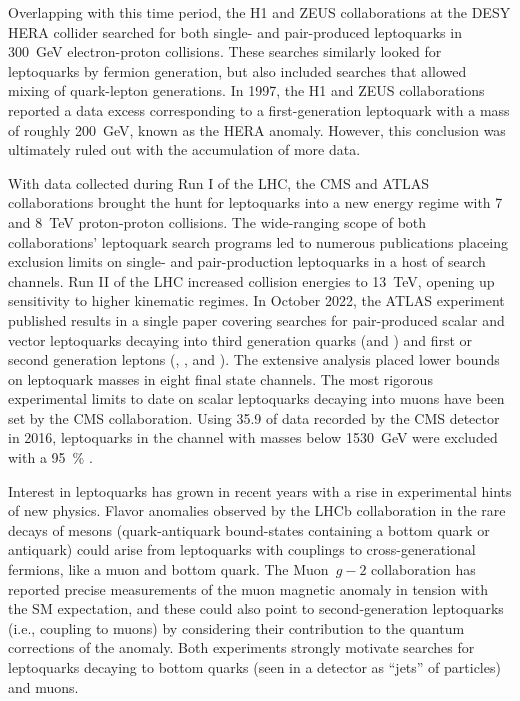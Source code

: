 Overlapping with this time period, the H1 and ZEUS collaborations at the DESY HERA collider searched for both single- and pair-produced leptoquarks in \SI{300}{\GeV} electron-proton collisions. These searches similarly looked for leptoquarks by fermion generation, but also included searches that allowed mixing of quark-lepton generations. In 1997, the H1 and ZEUS collaborations reported a data excess corresponding to a first-generation leptoquark with a mass of roughly \SI{200}{\GeV}, known as the HERA anomaly. However, this conclusion was ultimately ruled out with the accumulation of more data.

With data collected during Run I of the LHC, the CMS and ATLAS collaborations brought the hunt for leptoquarks into a new energy regime with 7 and \SI{8}{\TeV} proton-proton collisions. The wide-ranging scope of both collaborations' leptoquark search programs led to numerous publications placeing exclusion limits on single- and pair-production leptoquarks in a host of search channels. Run II of the LHC increased collision energies to \SI{13}{\TeV}, opening up sensitivity to higher kinematic regimes. In October 2022, the ATLAS experiment published results in a single paper covering searches for pair-produced scalar and vector leptoquarks decaying into third generation quarks (\Ptop and \Pbottom) and first or second generation leptons (\Pe, \Pmu, and \Pnu). The extensive analysis placed lower bounds on leptoquark masses in eight final state channels. The most rigorous experimental limits to date on scalar leptoquarks decaying into muons have been set by the CMS collaboration. Using \SI{35.9}{\invfb} of data recorded by the CMS detector in 2016, leptoquarks in the \mumujj channel with masses below \SI{1530}{\GeV} were excluded with a \SI{95}{\%} \CL. 

Interest in leptoquarks has grown in recent years with a rise in experimental hints of new physics. Flavor anomalies observed by the LHCb collaboration in the rare decays of \PB mesons (quark-antiquark bound-states containing a bottom quark or antiquark) could arise from leptoquarks with couplings to cross-generational fermions, like a muon and bottom quark. The Muon~$g-2$ collaboration has reported precise measurements of the muon magnetic anomaly in tension with the SM expectation, and these could also point to second-generation leptoquarks (i.e., coupling to muons) by considering their contribution to the quantum corrections of the anomaly. Both experiments strongly motivate searches for leptoquarks decaying to bottom quarks (seen in a detector as ``jets'' of particles) and muons.

